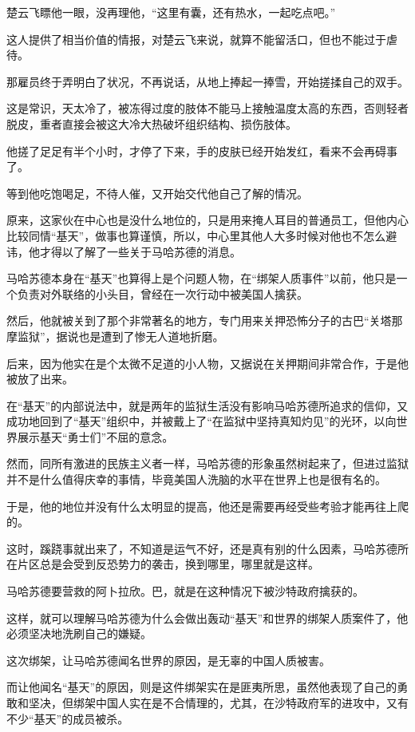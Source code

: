 楚云飞瞟他一眼，没再理他，“这里有囊，还有热水，一起吃点吧。”

这人提供了相当价值的情报，对楚云飞来说，就算不能留活口，但也不能过于虐待。

那雇员终于弄明白了状况，不再说话，从地上捧起一捧雪，开始搓揉自己的双手。

这是常识，天太冷了，被冻得过度的肢体不能马上接触温度太高的东西，否则轻者脱皮，重者直接会被这大冷大热破坏组织结构、损伤肢体。

他搓了足足有半个小时，才停了下来，手的皮肤已经开始发红，看来不会再碍事了。

等到他吃饱喝足，不待人催，又开始交代他自己了解的情况。

原来，这家伙在中心也是没什么地位的，只是用来掩人耳目的普通员工，但他内心比较同情“基天”，做事也算谨慎，所以，中心里其他人大多时候对他也不怎么避讳，他才得以了解了一些关于马哈苏德的消息。

马哈苏德本身在“基天”也算得上是个问题人物，在“绑架人质事件”以前，他只是一个负责对外联络的小头目，曾经在一次行动中被美国人擒获。

然后，他就被关到了那个非常著名的地方，专门用来关押恐怖分子的古巴“关塔那摩监狱”，据说也是遭到了惨无人道地折磨。

后来，因为他实在是个太微不足道的小人物，又据说在关押期间非常合作，于是他被放了出来。

在“基天”的内部说法中，就是两年的监狱生活没有影响马哈苏德所追求的信仰，又成功地回到了“基天”组织中，并被戴上了“在监狱中坚持真知灼见”的光环，以向世界展示基天“勇士们”不屈的意念。

然而，同所有激进的民族主义者一样，马哈苏德的形象虽然树起来了，但进过监狱并不是什么值得庆幸的事情，毕竟美国人洗脑的水平在世界上也是很有名的。

于是，他的地位并没有什么太明显的提高，他还是需要再经受些考验才能再往上爬的。

这时，蹊跷事就出来了，不知道是运气不好，还是真有别的什么因素，马哈苏德所在片区总是会受到反恐势力的袭击，换到哪里，哪里就是这样。

马哈苏德要营救的阿卜拉欣。巴，就是在这种情况下被沙特政府擒获的。

这样，就可以理解马哈苏德为什么会做出轰动“基天”和世界的绑架人质案件了，他必须坚决地洗刷自己的嫌疑。

这次绑架，让马哈苏德闻名世界的原因，是无辜的中国人质被害。

而让他闻名“基天”的原因，则是这件绑架实在是匪夷所思，虽然他表现了自己的勇敢和坚决，但绑架中国人实在是不合情理的，尤其，在沙特政府军的进攻中，又有不少“基天”的成员被杀。


